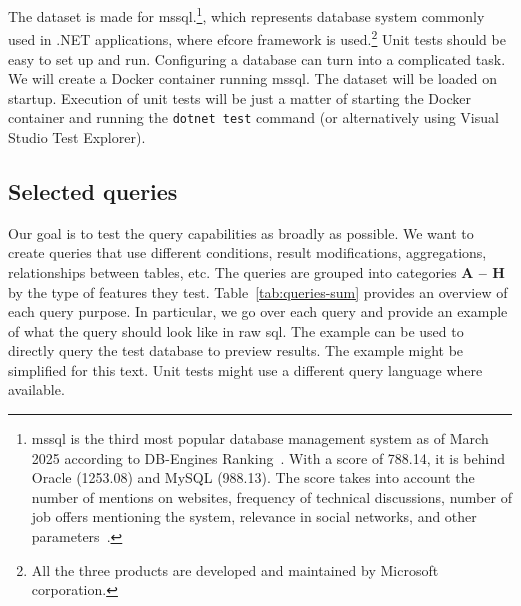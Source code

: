 The dataset is made for \acrshort{mssql}.\footnote{\acrshort{mssql} is the third most popular database management system as of March 2025 according to DB-Engines Ranking~\cite{DBEngines2025Ranking}. With a score of 788.14, it is behind Oracle (1253.08) and MySQL (988.13). The score takes into account the number of mentions on websites, frequency of technical discussions, number of job offers mentioning the system, relevance in social networks, and other parameters~\cite{DBEnginesRankingMetrics}.}, which represents database system commonly used in .NET applications, where \acrshort{efcore} framework is used.\footnote{All the three products are developed and maintained by Microsoft corporation.}  
Unit tests should be easy to set up and run. Configuring a database can turn into a complicated task. We will create a Docker container running \acrshort{mssql}. The dataset will be loaded on startup. Execution of unit tests will be just a matter of starting the Docker container and running the \texttt{dotnet test} command (or alternatively using Visual Studio Test Explorer). 

\subsection{Selected queries}
\label{sec:selected_queries}
Our goal is to test the query capabilities as broadly as possible. We want to create queries that use different conditions, result modifications, aggregations, relationships between tables, etc. The queries are grouped into categories \textbf{A -- H} by the type of features they test. Table~\ref{tab:queries-sum} provides an overview of each query purpose. In particular, we go over each query and provide an example of what the query should look like in raw \acrshort{sql}. The example can be used to directly query the test database to preview results. The example might be simplified for this text. Unit tests might use a different query language where available.

